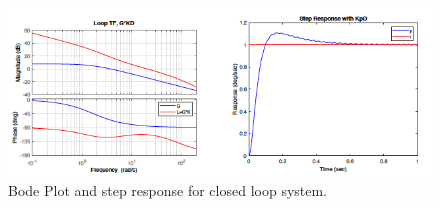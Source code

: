 \documentclass[12pt]{article}
\begin{document}
\begin{figure}[H]
    \centering
    \includegraphics[width=\linewidth]{figs/12.4.png}
    \caption{Bode Plot and step response for closed loop system. }
    \label{fig:enter-label}
\end{figure}
\end{document}
